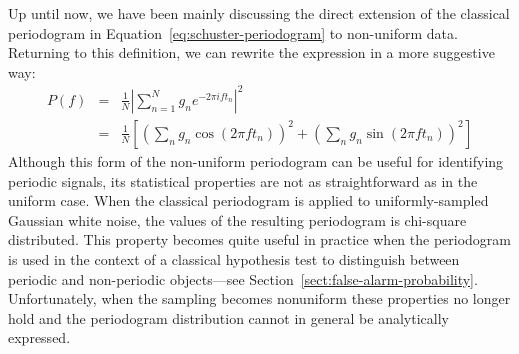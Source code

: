 \documentclass[preprint]{aastex}
\newcommand{\Eq}[1]{Equation~\ref{eq:#1}}
\newcommand{\eq}[1]{\Eq{#1}}
\newcommand{\eqlabel}[1]{\label{eq:#1}}
\newcommand{\Sect}[1]{Section~\ref{sect:#1}}
\newcommand{\sect}[1]{\Sect{#1}}
\begin{document}
Up until now, we have been mainly discussing the direct extension of the
classical periodogram in \eq{schuster-periodogram} to non-uniform data.
Returning to this definition, we can rewrite the expression in a more
suggestive way:
\begin{eqnarray}
  P(f)
  &=& \frac{1}{N}\left|\sum_{n=1}^N g_n e^{-2\pi i f t_n} \right|^2 \nonumber\\
  &=& \frac{1}{N}\left[
    \left(\sum_n g_n \cos(2\pi f t_n)\right)^2
    + \left(\sum_n g_n \sin(2\pi f t_n)\right)^2
    \right]
  \eqlabel{classical-periodogram}
\end{eqnarray}
Although this form of the non-uniform periodogram can be useful for identifying
periodic signals, its statistical properties are not as straightforward as in
the uniform case.
When the classical periodogram is applied to uniformly-sampled Gaussian
white noise,
the values of the resulting periodogram is chi-square distributed.
This property becomes quite useful in practice when the periodogram is used in the
context of a classical hypothesis test to distinguish between periodic and
non-periodic objects---see \sect{false-alarm-probability}.
Unfortunately, when the sampling becomes nonuniform these properties no longer
hold and the periodogram distribution cannot in general be analytically expressed.
\end{document}
